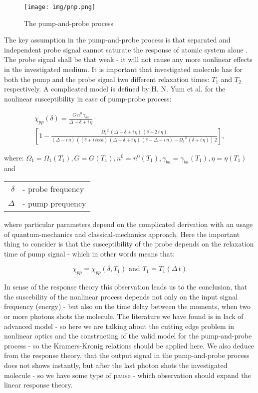 \documentclass[12pt,twoside,a4paper]{article}
\numberwithin{equation}{subsection}
\numberwithin{figure}{subsection}
\begin{document}
\begin{figure} 
  \texttt{[image: img/pnp.png]}
  \caption{The pump-and-probe process\label{fig:pump_and_probe}}
\end{figure}


The key assumption in the pump-and-probe process is that separated and independent probe signal cannot saturate the response of atomic system
alone \cite{boyd_nlo}. The probe signal shall be that weak - it will not cause any more nonlinear effects in the investigated medium. It is
important that investigated molecule has for both the pump and the probe signal two different relaxation times: ${T_{1}}$  and ${T_{2}}$
respectively. A complicated model is defined by H. N. Yum et al. \cite{yum_pump} for the nonlinear susceptibility in case of pump-probe process:

\begin{multline}   \label{eq:pump_equation}
     {\chi_{pp}}(\delta ) = \frac {G\,n^{0}\,{\gamma_{ba}}}{\Delta  + \delta  + i\,\eta } \cdot \\
     [1 - \frac {{\Omega_{1}}^{2}\,(\Delta  - \delta  + i\,\eta )\,(\delta  + 2\,i\,\eta )}{(\Delta  - i\,\eta )\,((\delta  + i\,
     teta)\,(\Delta  + \delta  + i\,\eta )\,(\delta  - \Delta  + i\,\eta ) - {\Omega_{1}}^{2}\,(\delta  + i\,\eta ))\,2}],
\end{multline}

where: ${\Omega_{1}} = \Omega_{1} ({T_{1}}), G = G({T_{1}}), n^{0} = n^{0}({T_{1}}), \gamma_{ba} = \gamma_{{ba}}({T_{1}}), \eta =
\eta ({T_{1}})$ and 

\begin{tabular} {r l}
  $\delta $ & - probe frequency \\
  $\Delta $ & - pump prequency \\
\end{tabular}



where particular parameters depend on the complicated derivation with an usage of quantum-mechanics and classical-mechanics approach. Here
the important thing to concider is that the susceptibility of the probe depends on the relaxation time of pump signal - which in other
words means that:

\begin{equation} \label{pump_depend}
  \chi_{pp} = \chi_{pp}(\delta, T_{1}) \mbox{ and } T_{1} = T_{1}(\Delta \, t)
\end{equation}

In sense of the response theory this observation leads us to the conclusion, that the suscebility of the nonlinear process depends not
only on the input signal frequency (energy) - but also on the time delay between the moments, when two or more photons shots the
molecule. The literature we have found is in lack of advanced model - so here we are talking about the cutting edge problem in nonlinear
optics and the constructing of the valid model for the pump-and-probe process - so the Kramers-Kronig relations should be applied here. We
also deduce from the response theory, that the output signal in the pump-and-probe process does not shows instantly, but after the last
photon shots the investigated molecule - so we have some type of pause - which observation should expand the linear response theory.
\end{document}
